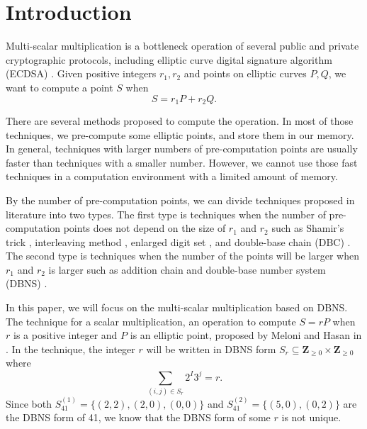\section{Introduction}

Multi-scalar multiplication is a bottleneck operation of several public and private cryptographic protocols, including elliptic curve digital signature algorithm (ECDSA) \cite{ECDSA}. Given positive integers $r_1, r_2$ and points on elliptic curves $P, Q$, we want to compute a point $S$ when 
$$S = r_1 P + r_2 Q.$$

There are several methods proposed to compute the operation. In most of those techniques, we pre-compute some elliptic points, and store them in our memory. In general, techniques with larger numbers of pre-computation points are usually faster than techniques with a smaller number. However, we cannot use those fast techniques in a computation environment with a limited amount of memory. 

By the number of pre-computation points, we can divide techniques proposed in literature into two types. The first type is techniques when the number of pre-computation points does not depend on the size of $r_1$ and $r_2$ such as Shamir’s trick \cite{Shamir}, interleaving method \cite{interleaving}, enlarged digit set \cite{enlarged2,enlarged4,enlarged1,enlarged3}, and double-base chain (DBC) \cite{dbc2,dbc3,dbc1}. The second type is techniques when the number of the points will be larger when $r_1$ and $r_2$ is larger such as addition chain \cite{additionChain1,additionChain2} and double-base number system (DBNS)  \cite{dbns}.

In this paper, we will focus on the multi-scalar multiplication based on DBNS. The technique for a scalar multiplication, an operation to compute $S = rP$ when $r$ is a positive integer and $P$ is an elliptic point, proposed by Meloni and Hasan in \cite{dbns}.  In the technique, the integer $r$ will be written in DBNS form $S_r \subseteq \mathbf{Z}_{\geq 0} \times \mathbf{Z}_{\geq 0}$ where
$$\sum_{(i,j) \in S_r} 2^I 3^j = r.$$ 
Since both $S^{(1)}_{41} = \{(2,2), (2,0), (0,0)\}$ and $S^{(2)}_{41} = \{(5,0), (0,2)\}$ are the DBNS form of 41, we know that the DBNS form of some $r$ is not unique.


